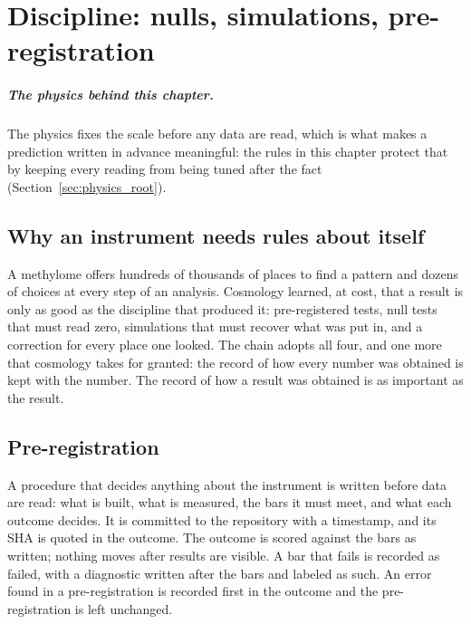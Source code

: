 \chapter{Discipline: nulls, simulations, pre-registration}\label{ch:discipline}

\paragraph{The physics behind this chapter.} The physics fixes the scale before any data are read, which is what makes a prediction written in advance meaningful: the rules in this chapter protect that by keeping every reading from being tuned after the fact (Section~\ref{sec:physics_root}).

\section{Why an instrument needs rules about itself}

A methylome offers hundreds of thousands of places to find a pattern and dozens of choices at every step of an analysis. Cosmology learned, at
cost, that a result is only as good as the discipline that produced it: pre-registered tests, null tests that must read zero, simulations that must
recover what was put in, and a correction for every place one looked. The chain adopts all four, and one more that cosmology takes for granted: the
record of how every number was obtained is kept with the number. The record of how a result was obtained is as important as the result.

\section{Pre-registration}

A procedure that decides anything about the instrument is written before data are read: what is built, what is measured, the bars it must meet, and what
each outcome decides. It is committed to the repository with a timestamp, and its SHA is quoted in the outcome. The outcome is scored against the bars as
written; nothing moves after results are visible. A bar that fails is recorded as failed, with a diagnostic written after the bars and labeled as such.
An error found in a pre-registration is recorded first in the outcome and the pre-registration is left unchanged.

